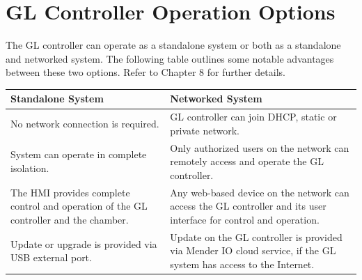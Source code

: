 \section{GL Controller Operation
Options}

The GL controller can operate as a standalone system or both as a
standalone and networked system. The following table outlines some
notable advantages between these two options. Refer to Chapter 8 for
further details.

\begin{longtable}[]{@{}ll@{}}
\toprule
\begin{minipage}[b]{0.48\columnwidth}\raggedright
Standalone System\strut
\end{minipage} & \begin{minipage}[b]{0.46\columnwidth}\raggedright
Networked System\strut
\end{minipage}\tabularnewline
\midrule
\endhead
\begin{minipage}[t]{0.48\columnwidth}\raggedright
No network connection is required.\strut
\end{minipage} & \begin{minipage}[t]{0.46\columnwidth}\raggedright
GL controller can join DHCP, static or private network.\strut
\end{minipage}\tabularnewline
\begin{minipage}[t]{0.48\columnwidth}\raggedright
System can operate in complete isolation.\strut
\end{minipage} & \begin{minipage}[t]{0.46\columnwidth}\raggedright
Only authorized users on the network can remotely access and operate the
GL controller.\strut
\end{minipage}\tabularnewline
\begin{minipage}[t]{0.48\columnwidth}\raggedright
The HMI provides complete control and operation of the GL controller and
the chamber.\strut
\end{minipage} & \begin{minipage}[t]{0.46\columnwidth}\raggedright
Any web-based device on the network can access the GL controller and its
user interface for control and operation.\strut
\end{minipage}\tabularnewline
\begin{minipage}[t]{0.48\columnwidth}\raggedright
Update or upgrade is provided via USB external port.\strut
\end{minipage} & \begin{minipage}[t]{0.46\columnwidth}\raggedright
Update on the GL controller is provided via Mender IO cloud service, if
the GL system has access to the Internet.\strut
\end{minipage}\tabularnewline
\bottomrule
\end{longtable}


